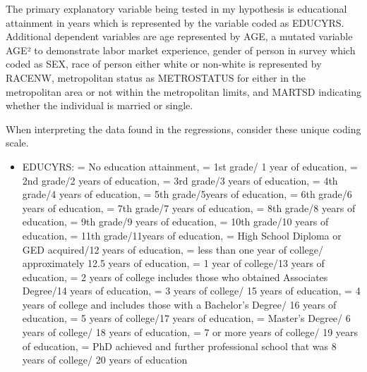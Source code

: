 \documentclass[12pt, English]{article}
\begin{document}
The primary explanatory variable being tested in my hypothesis is educational attainment in years which is represented by the variable coded as EDUCYRS. Additional dependent variables are age represented by AGE, a mutated variable AGE² to demonstrate labor market experience, gender of person in survey which coded as SEX, race of person either white or non-white is represented by RACENW, metropolitan status as METROSTATUS for either in the metropolitan area or not within the metropolitan limits, and MARTSD indicating whether the individual is married or single. 

\newpage
When interpreting the data found in the regressions, consider these unique coding scale. 
\begin{itemize}
\item EDUCYRS:  = No education attainment,  = 1st grade/ 1 year of education, = 2nd grade/2 years of education,  = 3rd grade/3 years of education,  = 4th grade/4 years of education,  = 5th grade/5years of education,  = 6th grade/6 years of education,  = 7th grade/7 years of education,   = 8th grade/8 years of education, = 9th grade/9 years of education,  = 10th grade/10 years of education,  = 11th grade/11years of education,  = High School Diploma or GED acquired/12 years of education, = less than one year of college/ approximately 12.5 years of education,  = 1 year of college/13 years of education,  = 2 years of college includes those who obtained Associates Degree/14 years of education,  = 3 years of college/ 15 years of education, = 4 years of college and includes those with a Bachelor’s Degree/ 16 years of education,  = 5 years of college/17 years of education,  = Master’s Degree/ 6 years of college/ 18 years of education, = 7 or more years of college/ 19 years of education,  = PhD achieved and further professional school that was 8 years of college/ 20 years of education \newline


\end{itemize}
\end{document}
